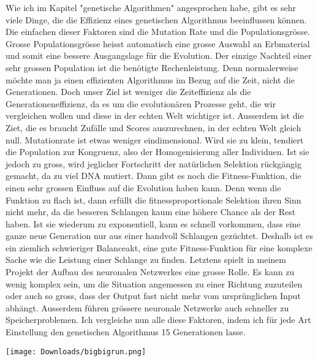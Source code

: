 \documentclass[11pt,a4paper,ngerman]{article}
\begin{document}
Wie ich im Kapitel "genetische Algorithmen" angesprochen habe, gibt es sehr viele Dinge, die die Effizienz eines genetischen Algorithmus beeinflussen können. Die einfachen dieser Faktoren sind die Mutation Rate und die Populationsgrösse. Grosse Populationsgrösse heisst automatisch eine grosse Auswahl an Erbmaterial und somit eine bessere Ausgangslage für die Evolution. Der einzige Nachteil einer sehr grossen Population ist die benötigte Rechenleistung. Denn normalerweise möchte man ja einen effizienten Algorithmus im Bezug auf die Zeit, nicht die Generationen. Doch unser Ziel ist weniger die Zeiteffizienz als die Generationeneffizienz, da es um die evolutionären Prozesse geht, die wir vergleichen wollen und diese in der echten Welt wichtiger ist. Ausserdem ist die Ziet, die es braucht Zufälle und Scores auszurechnen, in der echten Welt gleich null. Mutationrate ist etwas weniger eindimensional. Wird sie zu klein, tendiert die Population zur Kongruenz, also der Homogenisierung aller Individuen. Ist sie jedoch zu gross, wird jeglicher Fortschritt der natürlichen Selektion rückgängig gemacht, da zu viel DNA mutiert. Dann gibt es noch die Fitness-Funktion, die einen sehr grossen Einfluss auf die Evolution haben kann. Denn wenn die Funktion zu flach ist, dann erfüllt die fitnessproportionale Selektion ihren Sinn nicht mehr, da die besseren Schlangen kaum eine höhere Chance als der Rest haben. Ist sie wiederum zu exponentiell, kann es schnell vorkommen, dass eine ganze neue Generation nur aus einer handvoll Schlangen gezüchtet. Deshalb ist es ein ziemlich schwieriger Balanceakt, eine gute Fitness-Funktion für eine komplexe Sache wie die Leistung einer Schlange zu finden. Letztens spielt in meinem Projekt der Aufbau des neuronalen Netzwerkes eine grosse Rolle. Es kann zu wenig komplex sein, um die Situation angemessen zu einer Richtung zuzuteilen oder auch so gross, dass der Output fast nicht mehr vom ursprünglichen Input abhängt. Ausserdem führen grössere neuronale Netzwerke auch schneller zu Speicherproblemen. Ich vergleiche nun alle diese Faktoren, indem ich für jede Art Einstellung den genetischen Algorithmus 15 Generationen lasse.

\begin{center}
    \texttt{[image: Downloads/bigbigrun.png]}
\end{center}
\end{document}
